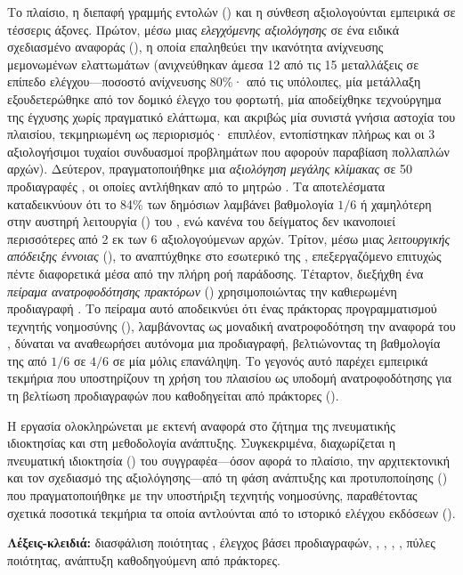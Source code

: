 Το πλαίσιο, η διεπαφή γραμμής εντολών () και η σύνθεση  αξιολογούνται εμπειρικά σε τέσσερις άξονες. Πρώτον, μέσω μιας \emph{ελεγχόμενης αξιολόγησης} σε ένα ειδικά σχεδιασμένο  αναφοράς (), η οποία επαληθεύει την ικανότητα ανίχνευσης μεμονωμένων ελαττωμάτων (ανιχνεύθηκαν άμεσα 12 από τις 15 μεταλλάξεις σε επίπεδο ελέγχου---ποσοστό ανίχνευσης 80\%· από τις υπόλοιπες, μία μετάλλαξη εξουδετερώθηκε από τον δομικό έλεγχο του φορτωτή, μία αποδείχθηκε τεχνούργημα της έγχυσης χωρίς πραγματικό ελάττωμα, και ακριβώς μία συνιστά γνήσια αστοχία του πλαισίου, τεκμηριωμένη ως περιορισμός· επιπλέον, εντοπίστηκαν πλήρως και οι 3 αξιολογήσιμοι τυχαίοι συνδυασμοί προβλημάτων που αφορούν παραβίαση πολλαπλών αρχών). Δεύτερον, πραγματοποιήθηκε μια \emph{αξιολόγηση μεγάλης κλίμακας} σε 50 προδιαγραφές , οι οποίες αντλήθηκαν από το μητρώο . Τα αποτελέσματα καταδεικνύουν ότι το 84\% των δημόσιων  λαμβάνει βαθμολογία $1/6$ ή χαμηλότερη στην αυστηρή λειτουργία () του , ενώ κανένα  του δείγματος δεν ικανοποιεί περισσότερες από 2 εκ των 6 αξιολογούμενων αρχών. Τρίτον, μέσω μιας \emph{λειτουργικής απόδειξης έννοιας} (), το  αναπτύχθηκε στο εσωτερικό  της , επεξεργαζόμενο επιτυχώς πέντε διαφορετικά  μέσα από την πλήρη ροή παράδοσης. Τέταρτον, διεξήχθη ένα \emph{πείραμα ανατροφοδότησης πρακτόρων} () χρησιμοποιώντας την καθιερωμένη προδιαγραφή . Το πείραμα αυτό αποδεικνύει ότι ένας πράκτορας προγραμματισμού τεχνητής νοημοσύνης (), λαμβάνοντας ως μοναδική ανατροφοδότηση την αναφορά του , δύναται να αναθεωρήσει αυτόνομα μια προδιαγραφή, βελτιώνοντας τη βαθμολογία της από $1/6$ σε $4/6$ σε μία μόλις επανάληψη. Το γεγονός αυτό παρέχει εμπειρικά τεκμήρια που υποστηρίζουν τη χρήση του πλαισίου ως υποδομή ανατροφοδότησης για τη βελτίωση προδιαγραφών που καθοδηγείται από πράκτορες ().

Η εργασία ολοκληρώνεται με εκτενή αναφορά στο ζήτημα της πνευματικής ιδιοκτησίας και στη μεθοδολογία ανάπτυξης. Συγκεκριμένα, διαχωρίζεται η πνευματική ιδιοκτησία () του συγγραφέα---όσον αφορά το πλαίσιο, την αρχιτεκτονική και τον σχεδιασμό της αξιολόγησης---από τη φάση ανάπτυξης και προτυποποίησης () που πραγματοποιήθηκε με την υποστήριξη τεχνητής νοημοσύνης, παραθέτοντας σχετικά ποσοτικά τεκμήρια τα οποία αντλούνται από το ιστορικό ελέγχου εκδόσεων ().

\noindent\textbf{Λέξεις-κλειδιά:} διασφάλιση ποιότητας , έλεγχος βάσει προδιαγραφών, , , , , πύλες ποιότητας, ανάπτυξη καθοδηγούμενη από πράκτορες.

\clearpage
